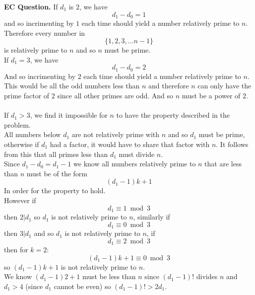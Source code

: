 \documentclass[12pt]{article}
\newenvironment{ques}{\vspace{2 ex}}{\vspace{2 ex}}
\theoremstyle{definition}
\begin{document}
\begin{ques}
	\textbf{EC Question.}
		If $d_1$ is $2$, we have 
		$$d_1 - d_0 = 1$$
		and so incrimenting by $1$ each time should yield a number
		relatively prime to $n$. Therefore every number in 
		$$\{1,2,3, \dots n-1\}$$
		is relatively prime to $n$ and so $n$ must be prime.\\
		If $d_1 = 3$, we have 
		$$d_1 - d_0 = 2$$
		And so incrimenting by $2$ each time should yield a number
		relatively prime to $n$. This would be all the odd numbers less
		than $n$ and therefore $n$ can only have the prime factor of
		$2$ since all other primes are odd. And so $n$ must be a power
		of $2$.\\
		\\
		If $d_1 > 3$, we find it impossible for $n$ to have the
		property described in the problem.\\
		All numbers below $d_1$ are not relatively prime with $n$ and so
		$d_1$ must be prime, otherwise if $d_1$ had a factor, it would have
		to share that factor with $n$. It follows from this that all
		primes less than $d_1$ must divide $n$.\\
		Since $d_1 - d_0 = d_1 - 1$ we know all numbers relatively
		prime to $n$ that are less than $n$ must be of the form 
		$$(d_1 - 1)k + 1$$
		In order for the property to hold.\\
		However if
		$$d_1 \equiv 1 \bmod 3$$
		then $2|d_1$ so $d_1$ is not relatively prime to $n$, similarly if 
		$$d_1 \equiv 0 \bmod 3$$
		then $3|d_1$ and so $d_1$ is not relatively prime to $n$, if
		$$d_1 \equiv 2 \bmod 3$$
		then for $k = 2$:
		$$(d_1 - 1)k + 1 \equiv 0 \bmod 3$$
		so $(d_1 - 1)k + 1$ is not relatively prime to $n$.\\
		We know $(d_1 - 1)2 + 1$ must be less than $n$ since $(d_1 -
		1)!$ divides $n$ and $d_1 > 4$ (since $d_1$ cannot be even) so
		$(d_1 - 1)! > 2d_1$.
\end{ques}
\end{document}
